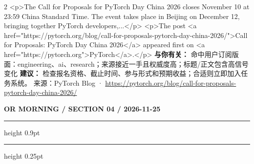 \documentclass[10.5pt]{ctexart}
\begin{document}
\begin{multicols}{2}
<p>The Call for Proposals for PyTorch Day China 2026 closes November 10 at 23:59 China Standard Time. The event takes place in Beijing on December 12, bringing together PyTorch developers,...</p> <p>The post <a href="https://pytorch.org/blog/call-for-proposals-pytorch-day-china-2026/">Call for Proposals: PyTorch Day China 2026</a> appeared first on <a href="https://pytorch.org">PyTorch</a>.</p>
\textbf{与你有关：} 命中用户订阅版面：engineering、ai、research；来源接近一手且权威度高；标题/正文包含高信号变化
\textbf{建议：} 检查报名资格、截止时间、参与形式和预期收益；合适则立即加入任务系统。
{\footnotesize\color{ormuted} 来源：PyTorch Blog · \url{https://pytorch.org/blog/call-for-proposals-pytorch-day-china-2026/}}
\end{multicols}
\newpage
{\small\bfseries OR MORNING / SECTION 04 / 2026-11-25}
\vspace{2mm}
\hrule height 0.9pt
\vspace{1.5mm}
\hrule height 0.25pt
\vspace{4mm}
\end{document}
